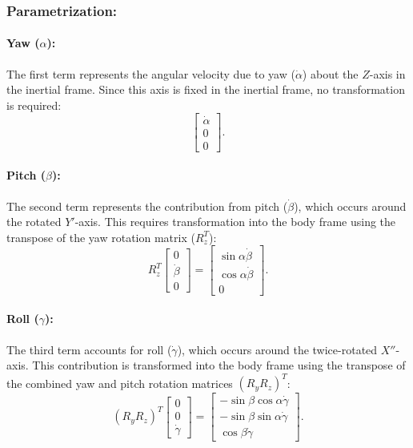 \documentclass[12pt]{article}
\begin{document}
\subsubsection{Parametrization:}
\paragraph{Yaw (\(\alpha\)):}
The first term represents the angular velocity due to yaw (\(\dot{\alpha}\)) about the \(Z\)-axis in the inertial frame. Since this axis is fixed in the inertial frame, no transformation is required:
\begin{equation}
\label{eq:omega_yaw}
\begin{bmatrix}
\dot{\alpha} \\
0 \\
0
\end{bmatrix}.
\end{equation}

\paragraph{Pitch (\(\beta\)):}
The second term represents the contribution from pitch (\(\dot{\beta}\)), which occurs around the rotated \(Y'\)-axis. This requires transformation into the body frame using the transpose of the yaw rotation matrix (\(R_z^T\)):
\begin{equation}
\label{eq:omega_pitch}
R_z^T
\begin{bmatrix}
0 \\
\dot{\beta} \\
0
\end{bmatrix}
=
\begin{bmatrix}
\sin\alpha\dot{\beta} \\
\cos\alpha\dot{\beta} \\
0
\end{bmatrix}.
\end{equation}

\paragraph{Roll (\(\gamma\)):}
The third term accounts for roll (\(\dot{\gamma}\)), which occurs around the twice-rotated \(X''\)-axis. This contribution is transformed into the body frame using the transpose of the combined yaw and pitch rotation matrices \((R_y R_z)^T\):
\begin{equation}
\label{eq:omega_roll}
(R_y R_z)^T
\begin{bmatrix}
0 \\
0 \\
\dot{\gamma}
\end{bmatrix}
=
\begin{bmatrix}
-\sin\beta\cos\alpha\dot{\gamma} \\
-\sin\beta\sin\alpha\dot{\gamma} \\
\cos\beta\dot{\gamma}
\end{bmatrix}.
\end{equation}
\end{document}
